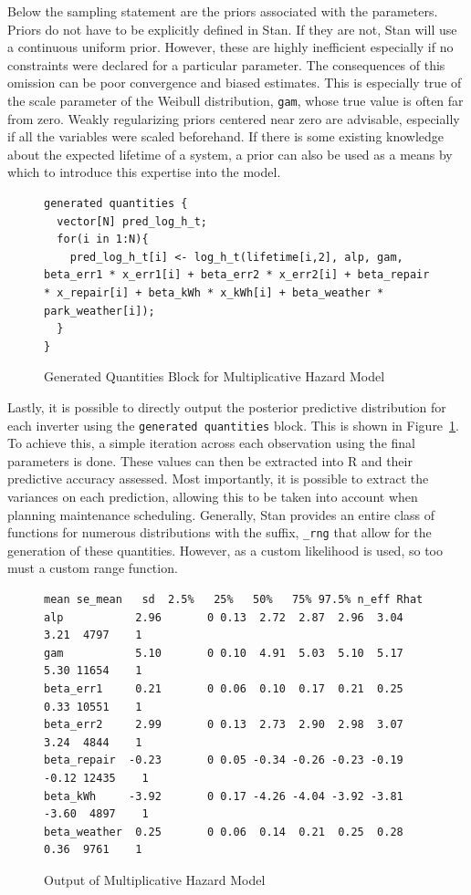 Below the sampling statement are the priors associated with the parameters. Priors do not have to be explicitly defined in Stan. If they are not, Stan will use a continuous uniform prior. However, these are highly inefficient especially if no constraints were declared for a particular parameter. The consequences of this omission can be poor convergence and biased estimates. This is especially true of the scale parameter of the Weibull distribution, \lstinline{gam}, whose true value is often far from zero. Weakly regularizing priors centered near zero are advisable, especially if all the variables were scaled beforehand. If there is some existing knowledge about the expected lifetime of a system, a prior can also be used as a means by which to introduce this expertise into the model. 



\begin{figure}[htbp]
    \centering
    \begin{lstlisting}[belowskip=-2 \baselineskip]
generated quantities {
  vector[N] pred_log_h_t;
  for(i in 1:N){
    pred_log_h_t[i] <- log_h_t(lifetime[i,2], alp, gam, beta_err1 * x_err1[i] + beta_err2 * x_err2[i] + beta_repair * x_repair[i] + beta_kWh * x_kWh[i] + beta_weather * park_weather[i]);
  }
}\end{lstlisting}
    \caption{Generated Quantities Block for Multiplicative Hazard Model}
    \label{mhaz_quants}
\end{figure}

Lastly, it is possible to directly output the posterior predictive distribution for each inverter using the \lstinline{generated quantities} block. This is shown in Figure~\ref{mhaz_quants}. To achieve this, a simple iteration across each observation using the final parameters is done. These values can then be extracted into R and their predictive accuracy assessed. Most importantly, it is possible to extract the variances on each prediction, allowing this to be taken into account when planning maintenance scheduling. Generally, Stan provides an entire class of functions for numerous distributions with the suffix, \lstinline{_rng} that allow for the generation of these quantities. However, as a custom likelihood is used, so too must a custom range function.

\begin{figure}[htbp]
    \centering
    \begin{lstlisting}[belowskip=-2 \baselineskip]
              mean se_mean   sd  2.5%   25%   50%   75% 97.5% n_eff Rhat
alp           2.96       0 0.13  2.72  2.87  2.96  3.04  3.21  4797    1
gam           5.10       0 0.10  4.91  5.03  5.10  5.17  5.30 11654    1
beta_err1     0.21       0 0.06  0.10  0.17  0.21  0.25  0.33 10551    1
beta_err2     2.99       0 0.13  2.73  2.90  2.98  3.07  3.24  4844    1
beta_repair  -0.23       0 0.05 -0.34 -0.26 -0.23 -0.19 -0.12 12435    1
beta_kWh     -3.92       0 0.17 -4.26 -4.04 -3.92 -3.81 -3.60  4897    1
beta_weather  0.25       0 0.06  0.14  0.21  0.25  0.28  0.36  9761    1\end{lstlisting}
    \caption{Output of Multiplicative Hazard Model}
    \label{mhaz_print}
\end{figure}

